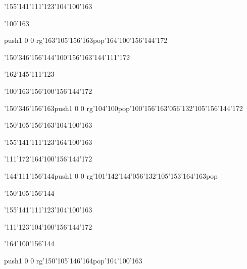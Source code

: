 \null\vfill\ipa\centerline{\enskip\enskip\enskip\enskip\char'155\char'141\char'111\char'123\enskip\enskip\enskip\enskip\char'104\char'100\char'163}\medskip\centerline{\enskip\char'100\char'163\enskip\enskip\enskip\enskip\enskip\enskip\enskip\enskip\enskip\enskip\enskip\enskip\enskip}\medskip\centerline{\enskip\enskip\enskip\enskip\enskip\pdfcolorstack\match push{1 0 0 rg}\char'163\char'105\char'156\char'163\pdfcolorstack\match pop{}\enskip\enskip\enskip\enskip\enskip\enskip\enskip\char'164\char'100\char'156\char'144\char'172}\medskip\centerline{\enskip\char'150\char'346\char'156\char'144\enskip\char'100\char'156\char'163\enskip\char'144\char'111\char'172\enskip\enskip\enskip\enskip}\medskip\vfill\footline{\hfil\tt\folio\hfil}\eject
\null\vfill\ipa\centerline{\enskip\enskip\enskip\enskip\char'162\char'145\char'111\char'123\enskip\enskip\enskip\enskip\enskip\enskip\enskip}\medskip\centerline{\enskip\char'100\char'163\enskip\enskip\enskip\enskip\enskip\enskip\enskip\enskip\char'156\char'100\char'156\char'144\char'172}\medskip\centerline{\enskip\enskip\enskip\enskip\enskip\char'150\char'346\char'156\char'163\enskip\pdfcolorstack\match push{1 0 0 rg}\char'104\char'100\pdfcolorstack\match pop{}\enskip\char'100\char'156\char'163\char'056\char'132\char'105\char'156\char'144\char'172}\medskip\centerline{\enskip\char'150\char'105\char'156\char'163\enskip\enskip\enskip\enskip\enskip\char'104\char'100\char'163\enskip\enskip\enskip\enskip}\medskip\vfill\footline{\hfil\tt\folio\hfil}\eject
\null\vfill\ipa\centerline{\enskip\enskip\enskip\enskip\char'155\char'141\char'111\char'123\enskip\enskip\enskip\enskip\char'164\char'100\char'163}\medskip\centerline{\enskip\char'111\char'172\enskip\enskip\enskip\enskip\enskip\enskip\enskip\enskip\char'164\char'100\char'156\char'144\char'172}\medskip\centerline{\enskip\enskip\enskip\enskip\enskip\char'144\char'111\char'156\char'144\enskip\enskip\enskip\enskip\pdfcolorstack\match push{1 0 0 rg}\char'101\char'142\char'144\char'056\char'132\char'105\char'153\char'164\char'163\pdfcolorstack\match pop{}}\medskip\centerline{\enskip\char'150\char'105\char'156\char'144\enskip\enskip\enskip\enskip\enskip\enskip\enskip\enskip\enskip\enskip\enskip}\medskip\vfill\footline{\hfil\tt\folio\hfil}\eject
\null\vfill\ipa\centerline{\enskip\enskip\enskip\enskip\char'155\char'141\char'111\char'123\enskip\enskip\enskip\enskip\char'104\char'100\char'163}\medskip\centerline{\enskip\char'111\char'123\enskip\enskip\enskip\enskip\enskip\enskip\enskip\enskip\char'104\char'100\char'156\char'144\char'172}\medskip\centerline{\enskip\enskip\enskip\enskip\enskip\char'164\char'100\char'156\char'144\enskip\enskip\enskip\enskip\enskip\enskip\enskip\enskip\enskip\enskip\enskip\enskip}\medskip\centerline{\enskip\pdfcolorstack\match push{1 0 0 rg}\char'150\char'105\char'146\char'164\pdfcolorstack\match pop{}\enskip\enskip\enskip\enskip\enskip\enskip\enskip\enskip\char'104\char'100\char'163}\medskip\vfill\footline{\hfil\tt\folio\hfil}\eject
